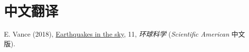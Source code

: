\section{中文翻译}

\begin{etaremune}
\item
    E. Vance (2018), \href{https://huanqiukexue.com/a/zazhi/2018/2018/1130/28180.html}{Earthquakes in the sky}, 11,
    \textit{环球科学} (\textit{Scientific American} 中文版).
\end{etaremune}
